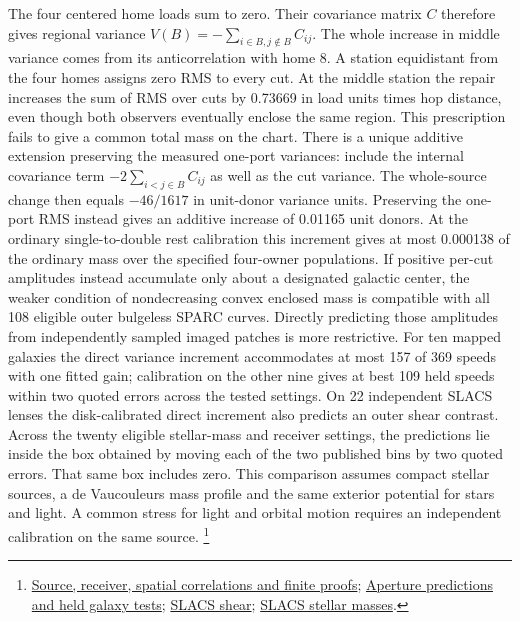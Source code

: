 \documentclass[11pt]{article}
\begin{document}
The four centered home loads sum to zero. Their covariance matrix
\(C\) therefore gives regional variance
\(V(B)=-\sum_{i\in B,j\notin B}C_{ij}\).
The whole increase in middle variance comes from its anticorrelation
with home 8. A station equidistant from the four homes assigns zero
RMS to every cut. At the middle station the repair increases the
sum of RMS over cuts by 0.73669 in load units times hop distance,
even though both observers eventually enclose the same region.
This prescription fails to give a common total mass on the chart.
There is a unique additive extension preserving the measured one-port
variances: include the internal covariance term
\(-2\sum_{i<j\in B}C_{ij}\) as well as the cut variance.
The whole-source change then equals \(-46/1617\) in unit-donor
variance units. Preserving the one-port RMS instead gives an additive
increase of 0.01165 unit donors. At the ordinary single-to-double rest
calibration this increment gives at most 0.000138 of the ordinary mass
over the specified four-owner populations.
If positive per-cut amplitudes instead accumulate only about a
designated galactic center, the weaker condition of nondecreasing
convex enclosed mass is compatible with all 108 eligible outer
bulgeless SPARC curves. Directly predicting those amplitudes from
independently sampled imaged patches is more restrictive. For ten
mapped galaxies the direct variance increment accommodates at most
157 of 369 speeds with one fitted gain; calibration on the other
nine gives at best 109 held speeds within two quoted errors across
the tested settings. On 22 independent SLACS lenses the disk-calibrated
direct increment also predicts an outer shear contrast. Across the
twenty eligible stellar-mass and receiver settings, the predictions
lie inside the box obtained by moving each of the two published bins
by two quoted errors. That same box includes zero. This comparison
assumes compact stellar sources, a de Vaucouleurs mass profile and the
same exterior potential for stars and light. A common stress for light and orbital motion requires an independent
calibration on the same source.%
\footnote{\href{https://github.com/FloatingPragma/observer-patch-holography/blob/main/model/experiments/interval_echo_shell_flux/product_address/green_response/material_recoil/overlap_source/native_boundary/stock/aperture/FLUCTUATION_RESULTS.md}{Source, receiver, spatial correlations and finite proofs};
\href{https://github.com/FloatingPragma/observer-patch-holography/blob/main/code/cosmology/paid_trail_bao/FLUCTUATION_CUTS.md}{Aperture predictions and held galaxy tests};
\href{https://arxiv.org/abs/astro-ph/0701589}{SLACS shear};
\href{https://arxiv.org/abs/0911.2471}{SLACS stellar masses}.}
\end{document}

